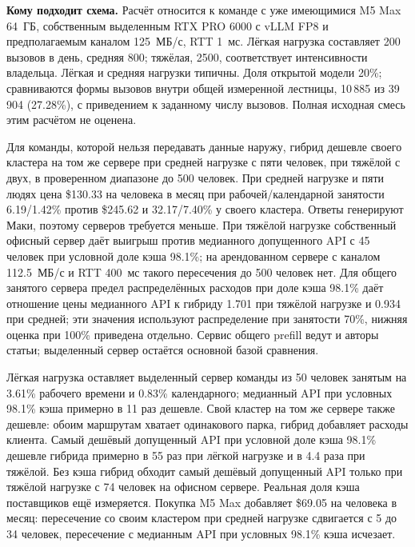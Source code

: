 \textbf{Кому подходит схема.} Расчёт относится к команде с уже имеющимися M5 Max 64~ГБ,
собственным выделенным RTX PRO 6000 с vLLM FP8 и предполагаемым каналом 125~МБ/с, RTT 1~мс.
Лёгкая нагрузка составляет 200 вызовов в день, средняя 800; тяжёлая, 2500, соответствует интенсивности владельца.
Лёгкая и средняя нагрузки типичны. Доля открытой модели 20\%; сравниваются формы вызовов внутри общей измеренной лестницы,
10\,885 из 39\,904 (27.28\%), с приведением к заданному числу вызовов. Полная исходная смесь этим расчётом не оценена.

Для команды, которой нельзя передавать данные наружу, гибрид дешевле своего кластера на том же сервере
при средней нагрузке с пяти человек, при тяжёлой с двух, в проверенном диапазоне до 500 человек.
При средней нагрузке и пяти людях цена \$130.33 на человека в месяц при рабочей/календарной занятости
6.19/1.42\% против \$245.62 и 32.17/7.40\% у своего кластера. Ответы генерируют Маки, поэтому серверов требуется меньше.
При тяжёлой нагрузке собственный офисный сервер даёт выигрыш против медианного допущенного API
с 45 человек при условной доле кэша 98.1\%; на арендованном сервере с каналом 112.5~МБ/с и RTT 400~мс
такого пересечения до 500 человек нет. Для общего занятого сервера предел распределённых расходов
при доле кэша 98.1\% даёт отношение цены медианного API к гибриду 1.701 при тяжёлой нагрузке
и 0.934 при средней; эти значения используют распределение при занятости 70\%, нижняя оценка при 100\% приведена отдельно.
Сервис общего prefill ведут и авторы статьи; выделенный сервер остаётся основной базой сравнения.

Лёгкая нагрузка оставляет выделенный сервер команды из 50 человек занятым на 3.61\% рабочего времени
и 0.83\% календарного; медианный API при условных 98.1\% кэша примерно в 11 раз дешевле.
Свой кластер на том же сервере также дешевле: обоим маршрутам хватает одинакового парка, гибрид добавляет расходы клиента.
Самый дешёвый допущенный API при условной доле кэша 98.1\% дешевле гибрида примерно в 55 раз при лёгкой нагрузке
и в 4.4 раза при тяжёлой. Без кэша гибрид обходит самый дешёвый допущенный API только при тяжёлой нагрузке
с 74 человек на офисном сервере. Реальная доля кэша поставщиков ещё измеряется.
Покупка M5 Max добавляет \$69.05 на человека в месяц: пересечение со своим кластером при средней нагрузке
сдвигается с 5 до 34 человек, пересечение с медианным API при условных 98.1\% кэша исчезает.

